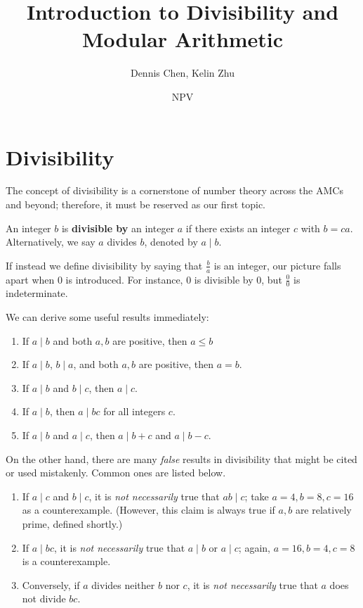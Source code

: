 \documentclass[mast]{lucky}
\title{Introduction to Divisibility and Modular Arithmetic}
\author{Dennis Chen, Kelin Zhu}
\date{NPV}
\begin{document}
\maketitle

\section{Divisibility}
The concept of divisibility is a cornerstone of number theory across the AMCs and beyond; therefore, it must be reserved as our first topic.

\begin{defi}[Divisibility]
An integer $b$ is \textbf{divisible by} an integer $a$ if there exists an integer $c$ with $b=ca$. Alternatively, we say $a$ divides $b$, denoted by $a \mid b$.
\end{defi}

\begin{remark}
If instead we define divisibility by saying that $\frac{b}{a}$ is an integer, our picture falls apart when $0$ is introduced. For instance, $0$ is divisible by $0$, but $\frac{0}{0}$ is indeterminate.
\end{remark}

We can derive some useful results immediately:

\begin{fact}
\hfill
\begin{enumerate}
    \item If $a\mid b$ and both $a,b$ are positive, then $a\le b$
    \item If $a\mid b$, $b\mid a$, and both $a,b$ are positive, then $a=b$.
    \item If $a\mid b$ and $b\mid c$, then $a\mid c.$
    \item If $a\mid b$, then $a\mid bc$ for all integers $c.$
    \item If $a\mid b$ and $a\mid c$, then $a\mid b+c$ and $a\mid b-c$.
\end{enumerate}
\end{fact}

On the other hand, there are many \emph{false} results in divisibility that might be cited or used mistakenly. Common ones are listed below.
\begin{enumerate}
\item If $a\mid c$ and $b\mid c$, it is \emph{not necessarily} true that $ab\mid c$; take $a=4,b=8,c=16$ as a counterexample. (However, this claim is always true if $a,b$ are relatively prime, defined shortly.)
\item If $a\mid bc$, it is \emph{not necessarily} true that $a\mid b$ or $a\mid c$; again, $a=16, b=4, c=8$ is a counterexample.
\item Conversely, if $a$ divides neither $b$ nor $c$, it is \emph{not necessarily} true that $a$ does not divide $bc$.
\end{enumerate}
\end{document}
